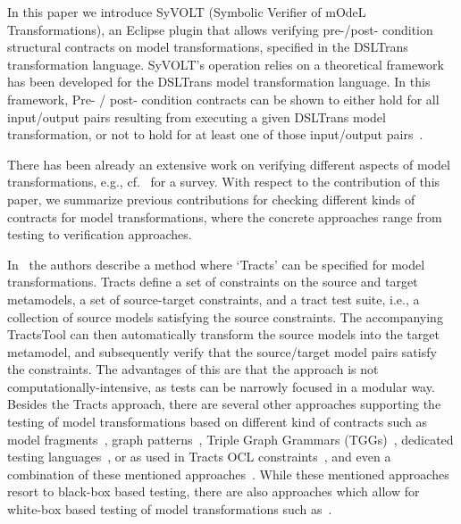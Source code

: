 In this paper we introduce SyVOLT (Symbolic Verifier of mOdeL Transformations),
an Eclipse plugin that allows verifying pre-/post- condition structural
contracts on model transformations, specified in the DSLTrans transformation
language. SyVOLT's operation relies on a theoretical framework has been
developed for the DSLTrans model transformation language. In this framework,
Pre- / post- condition contracts can be shown to either hold for all input/output pairs resulting from
executing a given DSLTrans model transformation, or not to hold for at least
one of those input/output pairs~\cite{Lucio2014}.


There has been already an extensive work on verifying different aspects of model
transformations, e.g., cf.~\cite{AmraniLSCDVTC12} for a survey.
With respect to the contribution of this paper, we summarize previous
contributions for checking different kinds of contracts for model
transformations, where the concrete approaches range from testing to
verification approaches.

In~\cite{Gogolla2011,Vallecillo2012} the authors describe a method where
`Tracts' can be specified for model transformations. Tracts define a set of
constraints on the source and target metamodels, a set of source-target
constraints, and a tract test suite, i.e., a collection of source models
satisfying the source constraints. The accompanying TractsTool can then
automatically transform the source models into the target metamodel, and
subsequently verify that the source/target model pairs satisfy the constraints.
The advantages of this are that the approach is not computationally-intensive,
as tests can be narrowly focused in a modular way. Besides the Tracts approach,
there are several other approaches supporting the testing of model
transformations based on different kind of contracts such as model
fragments~\cite{Mottu2008}, graph patterns~\cite{Guerra12,BaloghBCGHMPPRVa10},
Triple Graph Grammars (TGGs)~\cite{WieberAS14}, dedicated testing
languages~\cite{Kolovos06,Garcia-Dominguez11}, or as used in Tracts OCL
constraints~\cite{Cariou09}, and even a combination of these mentioned
approaches~\cite{Pele}. While these mentioned approaches resort to black-box
based testing, there are also approaches which allow for white-box based testing
of model transformations such as~\cite{GonzalezC12}.

